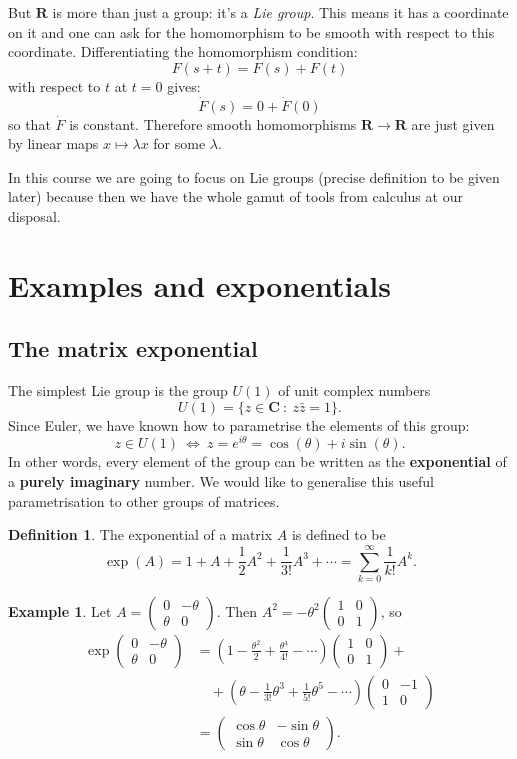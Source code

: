 \documentclass[12pt]{article}
\newcommand{\CC}{\mathbf{C}}
\newcommand{\RR}{\mathbf{R}}
\newcommand{\matr}[4]{\left(\begin{array}{cc}#1 & #2\\ #3 & #4\end{array}\right)}
\theoremstyle{definition}
\newtheorem{dfn}[thm]{Definition}
\newtheorem{exm}[thm]{Example}
\theoremstyle{check}
\theoremstyle{remark}
\theoremstyle{TheoremNum}
\begin{document}
But $\RR$ is more than just a group: it's a {\em Lie group}. This means it has a coordinate on it and one can ask for the homomorphism to be smooth with respect to this coordinate. Differentiating the homomorphism condition:
\[F(s+t)=F(s)+F(t)\]
with respect to $t$ at $t=0$ gives:
\[\dot{F}(s)=0+\dot{F}(0)\]
so that $\dot{F}$ is constant. Therefore smooth homomorphisms $\RR\to\RR$ are just given by linear maps $x\mapsto\lambda x$ for some $\lambda$.

In this course we are going to focus on Lie groups (precise definition to be given later) because then we have the whole gamut of tools from calculus at our disposal.

\section{Examples and exponentials}


\subsection{The matrix exponential}

The simplest Lie group is the group $U(1)$ of unit complex numbers
\[U(1)=\{z\in\CC\ :\ z\bar{z}=1\}.\]
Since Euler, we have known how to parametrise the elements of this group:
\[z\in U(1)\ \Leftrightarrow\ z=e^{i\theta}=\cos(\theta)+i\sin(\theta).\]
In other words, every element of the group can be written as the {\bf exponential} of a {\bf purely imaginary} number. We would like to generalise this useful parametrisation to other groups of matrices.

\begin{dfn}
The exponential of a matrix $A$ is defined to be
\[\exp(A)=1+A+\frac{1}{2}A^2+\frac{1}{3!}A^3+\cdots=\sum_{k=0}^{\infty}\frac{1}{k!}A^k.\]
\end{dfn}


\begin{exm}
Let $A=\matr{0}{-\theta}{\theta}{0}$. Then $A^2=-\theta^2\matr{1}{0}{0}{1}$, so
\begin{align*}
\exp\matr{0}{-\theta}{\theta}{0}&=\left(1-\frac{\theta^2}{2}+\frac{\theta^4}{4!}-\cdots\right)\matr{1}{0}{0}{1}+\\
                                &\quad+\left(\theta-\frac{1}{3!}\theta^3+\frac{1}{5!}\theta^5-\cdots\right)\matr{0}{-1}{1}{0}\\
                                &=\matr{\cos\theta}{-\sin\theta}{\sin\theta}{\cos\theta}.
\end{align*}
\end{exm}
\end{document}
